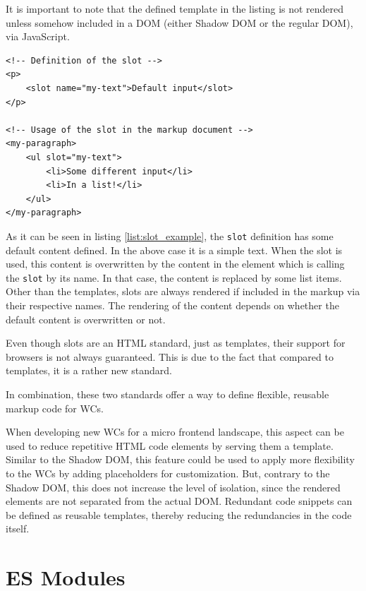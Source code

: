 It is important to note that the defined template in the listing is not rendered unless somehow included in a DOM (either Shadow DOM or the regular DOM), via JavaScript.

\newpage

\begin{lstlisting}[language=HTML5, caption=Definition and usage of the \texttt{slot} standard \cite{wc_html_template_slots}, label=list:slot_example,  xleftmargin=.0\textwidth, xrightmargin=.0\textwidth]
<!-- Definition of the slot -->
<p>
	<slot name="my-text">Default input</slot>
</p>

<!-- Usage of the slot in the markup document -->
<my-paragraph>
	<ul slot="my-text">
		<li>Some different input</li>
		<li>In a list!</li>
	</ul>
</my-paragraph>
\end{lstlisting}

As it can be seen in listing \ref{list:slot_example}, the \texttt{slot} definition has some default content defined. In the above case it is a simple text. When the slot is used, this content is overwritten by the content in the element which is calling the \texttt{slot} by its name.
In that case, the content is replaced by some list items.
Other than the templates, slots are always rendered if included in the markup via their respective names. The rendering of the content depends on whether the default content is overwritten or not.

Even though slots are an HTML standard, just as templates, their support for browsers is not always guaranteed. This is due to the fact that compared to templates, it is a rather new standard.

In combination, these two standards offer a way to define flexible, reusable markup code for WCs.\cite{wc_html_template_slots} 

When developing new WCs for a micro frontend landscape, this aspect can be used to reduce repetitive HTML code elements by serving them a template. Similar to the Shadow DOM, this feature could be used to apply more flexibility to the WCs by adding placeholders for customization. But, contrary to the Shadow DOM, this does not increase the level of isolation, since the rendered elements are not separated from the actual DOM. Redundant code snippets can be defined as reusable templates, thereby reducing the redundancies in the code itself.

\section{ES Modules}

